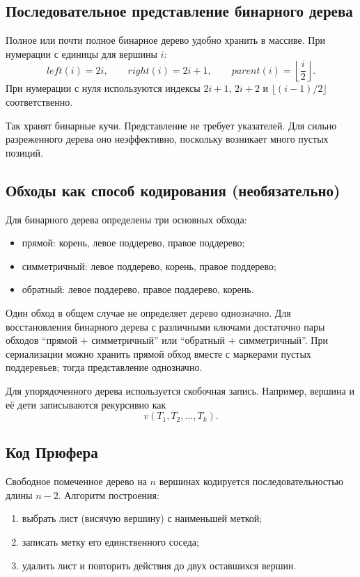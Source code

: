 \subsection{Последовательное представление бинарного дерева}

Полное или почти полное бинарное дерево удобно хранить в массиве. При нумерации с единицы для вершины $i$:
\[
    left(i)=2i,
    \qquad
    right(i)=2i+1,
    \qquad
    parent(i)=\left\lfloor\frac{i}{2}\right\rfloor.
\]
При нумерации с нуля используются индексы $2i+1$, $2i+2$ и $\lfloor(i-1)/2\rfloor$ соответственно.

Так хранят бинарные кучи. Представление не требует указателей. Для сильно разреженного дерева оно неэффективно, поскольку возникает много пустых позиций.

\subsection{Обходы как способ кодирования (необязательно)}

Для бинарного дерева определены три основных обхода:
\begin{itemize}
    \item прямой: корень, левое поддерево, правое поддерево;
    \item симметричный: левое поддерево, корень, правое поддерево;
    \item обратный: левое поддерево, правое поддерево, корень.
\end{itemize}

Один обход в общем случае не определяет дерево однозначно. Для восстановления бинарного дерева с различными ключами достаточно пары обходов ``прямой + симметричный'' или ``обратный + симметричный''. При сериализации можно хранить прямой обход вместе с маркерами пустых поддеревьев; тогда представление однозначно.

Для упорядоченного дерева используется скобочная запись. Например, вершина и её дети записываются рекурсивно как
\[
    v(T_1,T_2,\ldots,T_k).
\]

\subsection{Код Прюфера}

Свободное помеченное дерево на $n$ вершинах кодируется последовательностью длины $n-2$. Алгоритм построения:
\begin{enumerate}
    \item выбрать лист (висячую вершину) с наименьшей меткой;
    \item записать метку его единственного соседа;
    \item удалить лист и повторить действия до двух оставшихся вершин.
\end{enumerate}

